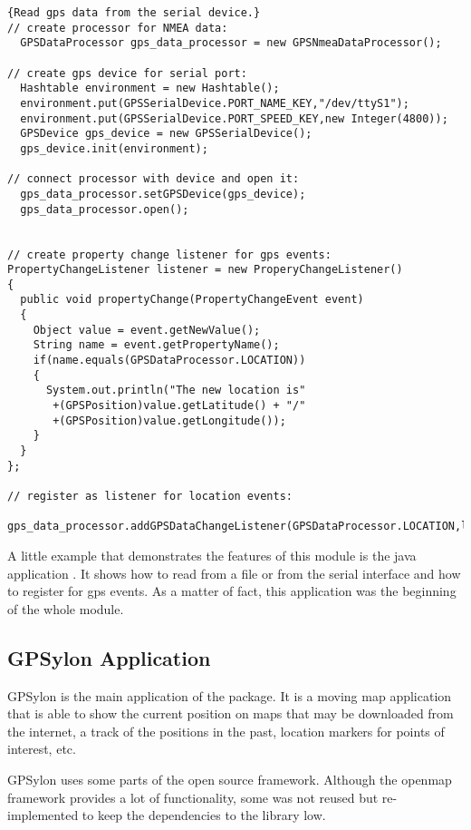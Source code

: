 \documentclass[a4paper]{article} %
\begin{document}
\begin{lstlisting}{Read gps data from the serial device.}
// create processor for NMEA data:
  GPSDataProcessor gps_data_processor = new GPSNmeaDataProcessor();

// create gps device for serial port:
  Hashtable environment = new Hashtable();
  environment.put(GPSSerialDevice.PORT_NAME_KEY,"/dev/ttyS1");
  environment.put(GPSSerialDevice.PORT_SPEED_KEY,new Integer(4800));
  GPSDevice gps_device = new GPSSerialDevice();
  gps_device.init(environment);

// connect processor with device and open it:
  gps_data_processor.setGPSDevice(gps_device);
  gps_data_processor.open();


// create property change listener for gps events:
PropertyChangeListener listener = new ProperyChangeListener()
{
  public void propertyChange(PropertyChangeEvent event)
  {
    Object value = event.getNewValue();
    String name = event.getPropertyName();
    if(name.equals(GPSDataProcessor.LOCATION))
    { 
      System.out.println("The new location is"
       +(GPSPosition)value.getLatitude() + "/"
       +(GPSPosition)value.getLongitude());
    }
  }
};

// register as listener for location events:
  gps_data_processor.addGPSDataChangeListener(GPSDataProcessor.LOCATION,listener);
\end{lstlisting}

A little example that demonstrates the features of this module is the
java application
. It shows how to
read from a file or from the serial interface and how to register for
gps events. As a matter of fact, this application was the beginning of
the whole module.


\subsection{GPSylon Application}
\label{SoftwareDesignOfTheGpstoolPackage-GpsmapApplication}

GPSylon is the main application of the 
package. It is a moving map application that is able to show the
current position on maps that may be downloaded from the internet, a
track of the positions in the past, location markers for points of
interest, etc.

GPSylon uses some parts of the open source
 framework. Although the
openmap framework provides a lot of functionality, some was not reused
but re-implemented to keep the dependencies to the library low.
\end{document}
